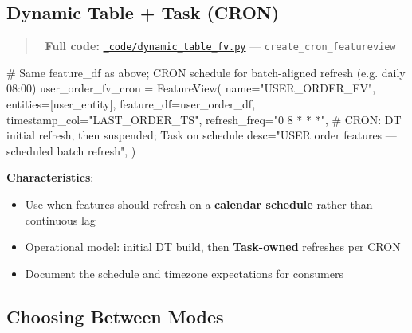 \documentclass[
  letterpaper,
  DIV=11,
  numbers=noendperiod]{scrreprt}
\newenvironment{Shaded}{\begin{snugshade}}{\end{snugshade}}
\newcommand{\CommentTok}[1]{\textcolor[rgb]{0.37,0.37,0.37}{#1}}
\newcommand{\NormalTok}[1]{\textcolor[rgb]{0.00,0.23,0.31}{#1}}
\newcommand{\OperatorTok}[1]{\textcolor[rgb]{0.37,0.37,0.37}{#1}}
\newcommand{\StringTok}[1]{\textcolor[rgb]{0.13,0.47,0.30}{#1}}
\providecommand{\tightlist}{%
  \setlength{\itemsep}{0pt}\setlength{\parskip}{0pt}}\usepackage{longtable,booktabs,array}
\begin{document}
\hypertarget{dynamic-table-task-cron}{%
\subsection{Dynamic Table + Task (CRON)}\label{dynamic-table-task-cron}}

\begin{quote}
📁 \textbf{Full code:}
\href{_code/dynamic_table_fv.py}{\texttt{\_code/dynamic\_table\_fv.py}}
--- \texttt{create\_cron\_featureview}
\end{quote}

\begin{Shaded}
\begin{Highlighting}[]
\CommentTok{\# Same feature\_df as above; CRON schedule for batch{-}aligned refresh (e.g. daily 08:00)}
\NormalTok{user\_order\_fv\_cron }\OperatorTok{=}\NormalTok{ FeatureView(}
\NormalTok{    name}\OperatorTok{=}\StringTok{"USER\_ORDER\_FV"}\NormalTok{,}
\NormalTok{    entities}\OperatorTok{=}\NormalTok{[user\_entity],}
\NormalTok{    feature\_df}\OperatorTok{=}\NormalTok{user\_order\_df,}
\NormalTok{    timestamp\_col}\OperatorTok{=}\StringTok{"LAST\_ORDER\_TS"}\NormalTok{,}
\NormalTok{    refresh\_freq}\OperatorTok{=}\StringTok{"0 8 * * *"}\NormalTok{,  }\CommentTok{\# CRON: DT initial refresh, then suspended; Task on schedule}
\NormalTok{    desc}\OperatorTok{=}\StringTok{"USER order features — scheduled batch refresh"}\NormalTok{,}
\NormalTok{)}
\end{Highlighting}
\end{Shaded}

\textbf{Characteristics}:

\begin{itemize}
\tightlist
\item
  Use when features should refresh on a \textbf{calendar schedule}
  rather than continuous lag
\item
  Operational model: initial DT build, then \textbf{Task-owned}
  refreshes per CRON
\item
  Document the schedule and timezone expectations for consumers
\end{itemize}

\hypertarget{choosing-between-modes}{%
\subsection{Choosing Between Modes}\label{choosing-between-modes}}
\end{document}
